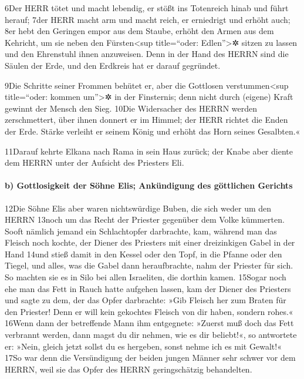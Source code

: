6Der HERR tötet und macht lebendig, er stößt ins Totenreich hinab und
führt herauf; 7der HERR macht arm und macht reich, er erniedrigt und
erhöht auch; 8er hebt den Geringen empor aus dem Staube, erhöht den
Armen aus dem Kehricht, um sie neben den Fürsten\textless sup
title=``oder: Edlen''\textgreater✲ sitzen zu lassen und den Ehrenstuhl
ihnen anzuweisen. Denn in der Hand des HERRN sind die Säulen der Erde,
und den Erdkreis hat er darauf gegründet.

9Die Schritte seiner Frommen behütet er, aber die Gottlosen
verstummen\textless sup title=``oder: kommen um''\textgreater✲ in der
Finsternis; denn nicht durch (eigene) Kraft gewinnt der Mensch den Sieg.
10Die Widersacher des HERRN werden zerschmettert, über ihnen donnert er
im Himmel; der HERR richtet die Enden der Erde. Stärke verleiht er
seinem König und erhöht das Horn seines Gesalbten.«

11Darauf kehrte Elkana nach Rama in sein Haus zurück; der Knabe aber
diente dem HERRN unter der Aufsicht des Priesters Eli.

\hypertarget{b-gottlosigkeit-der-suxf6hne-elis-ankuxfcndigung-des-guxf6ttlichen-gerichts}{%
\paragraph{b) Gottlosigkeit der Söhne Elis; Ankündigung des göttlichen
Gerichts}\label{b-gottlosigkeit-der-suxf6hne-elis-ankuxfcndigung-des-guxf6ttlichen-gerichts}}

12Die Söhne Elis aber waren nichtswürdige Buben, die sich weder um den
HERRN 13noch um das Recht der Priester gegenüber dem Volke kümmerten.
Sooft nämlich jemand ein Schlachtopfer darbrachte, kam, während man das
Fleisch noch kochte, der Diener des Priesters mit einer dreizinkigen
Gabel in der Hand 14und stieß damit in den Kessel oder den Topf, in die
Pfanne oder den Tiegel, und alles, was die Gabel dann heraufbrachte,
nahm der Priester für sich. So machten sie es in Silo bei allen
Israeliten, die dorthin kamen. 15Sogar noch ehe man das Fett in Rauch
hatte aufgehen lassen, kam der Diener des Priesters und sagte zu dem,
der das Opfer darbrachte: »Gib Fleisch her zum Braten für den Priester!
Denn er will kein gekochtes Fleisch von dir haben, sondern rohes.«
16Wenn dann der betreffende Mann ihm entgegnete: »Zuerst muß doch das
Fett verbrannt werden, dann magst du dir nehmen, wie es dir beliebt!«,
so antwortete er: »Nein, gleich jetzt sollst du es hergeben, sonst nehme
ich es mit Gewalt!« 17So war denn die Versündigung der beiden jungen
Männer sehr schwer vor dem HERRN, weil sie das Opfer des HERRN
geringschätzig behandelten.


